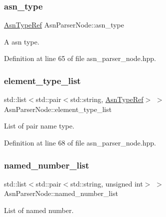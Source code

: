 \subsubsection{\texorpdfstring{asn\+\_\+type}{asn\_type}}
{\footnotesize\ttfamily \hyperlink{asn__type_8hpp_a456d7cf50c15d087cc0428ae80834b35}{Asn\+Type\+Ref} Asn\+Parser\+Node\+::asn\+\_\+type}



A asn type. 



Definition at line 65 of file asn\+\_\+parser\+\_\+node.\+hpp.

\mbox{\label{structAsnParserNode_afa15078343d3e0c91e8cc2c86f07ae35}} 
\subsubsection{\texorpdfstring{element\+\_\+type\+\_\+list}{element\_type\_list}}
{\footnotesize\ttfamily std\+::list$<$std\+::pair$<$std\+::string, \hyperlink{asn__type_8hpp_a456d7cf50c15d087cc0428ae80834b35}{Asn\+Type\+Ref}$>$ $>$ Asn\+Parser\+Node\+::element\+\_\+type\+\_\+list}



List of pair name type. 



Definition at line 68 of file asn\+\_\+parser\+\_\+node.\+hpp.

\mbox{\label{structAsnParserNode_a29c6beda4d49411435e47901dcda4f97}} 
\subsubsection{\texorpdfstring{named\+\_\+number\+\_\+list}{named\_number\_list}}
{\footnotesize\ttfamily std\+::list$<$std\+::pair$<$std\+::string, unsigned int$>$ $>$ Asn\+Parser\+Node\+::named\+\_\+number\+\_\+list}



List of named number. 



